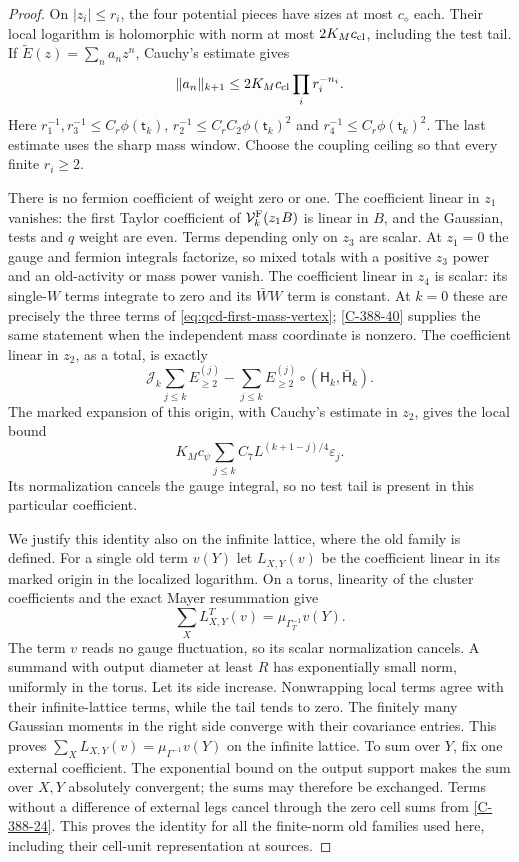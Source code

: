 \documentclass[11pt,letterpaper,reqno]{amsart}
\theoremstyle{definition}
\theoremstyle{remark}
\begin{document}
\begin{proof}
On $|z_i|\le r_i$, the four potential pieces have sizes
at most $c_\diamond$ each.  Their local logarithm is
holomorphic with norm at most $2K_Mc_{\rm cl}$, including
the test tail.  If $\widetilde E(z)=\sum_na_nz^n$,
Cauchy's estimate gives
\[
 \|a_n\|_{k+1}\le2K_Mc_{\rm cl}\prod_ir_i^{-n_i}.
\]
Here $r_1^{-1},r_3^{-1}\le C_r\phi(\mathsf t_k)$,
$r_2^{-1}\le C_rC_2\phi(\mathsf t_k)^2$ and
$r_4^{-1}\le C_r\phi(\mathsf t_k)^2$.  The last estimate uses
the sharp mass window.  Choose the coupling ceiling so
that every finite $r_i\ge2$.

There is no fermion coefficient of weight zero or one.
The coefficient linear in $z_1$ vanishes: the first Taylor
coefficient of $\mathcal V_k^{\rm F}(z_1B)$ is linear in $B$,
and the Gaussian, tests and $q$ weight are even.  Terms depending only on $z_3$ are
scalar.  At $z_1=0$ the gauge and fermion integrals
factorize, so mixed totals with a positive $z_3$ power
and an old-activity or mass power vanish.  The coefficient
linear in $z_4$ is scalar: its single-$W$ terms integrate
to zero and its $\bar WW$ term is constant.  At $k=0$ these
are precisely the three terms of
\eqref{eq:qcd-first-mass-vertex}; \cref{C-388-40} supplies
the same statement when the independent mass coordinate
is nonzero.
The coefficient linear in $z_2$, as a total, is exactly
\[
 \mathcal J_k\sum_{j\le k}E_{\ge2}^{(j)}
       -\sum_{j\le k}E_{\ge2}^{(j)}
                         \circ(\mathsf H_k,\bar{\mathsf H}_k).
\]
The marked expansion of this origin, with Cauchy's estimate
in $z_2$, gives the local bound
\[
 K_Mc_\psi\sum_{j\le k}C_7L^{(k+1-j)/4}\varepsilon_j.
\]
Its normalization cancels the gauge integral, so no test
tail is present in this particular coefficient.

We justify this identity also on the infinite lattice,
where the old family is defined.  For a single old term
$v(Y)$ let $L_{X,Y}(v)$ be the coefficient linear in its
marked origin in the localized logarithm.  On a torus,
linearity of the cluster coefficients and the exact
Mayer resummation give
\[
 \sum_XL^T_{X,Y}(v)=\mu_{\Gamma_T^{-1}}v(Y).
\]
The term $v$ reads no gauge fluctuation, so its scalar
normalization cancels.  A summand with output diameter
at least $R$ has exponentially small norm, uniformly
in the torus.  Let its side increase.  Nonwrapping
local terms agree with their infinite-lattice terms,
while the tail tends to zero.  The finitely many
Gaussian moments in the right side converge with
their covariance entries.  This proves
$\sum_XL_{X,Y}(v)=\mu_{\Gamma^{-1}}v(Y)$ on the
infinite lattice.  To sum over $Y$, fix one external
coefficient.  The exponential bound on the output
support makes the sum over $X,Y$ absolutely convergent;
the sums may therefore be exchanged.  Terms without
a difference of external legs cancel through the
zero cell sums from \cref{C-388-24}.  This proves the
identity for all the finite-norm old families used here,
including their cell-unit representation at sources.


\end{proof}
\end{document}
